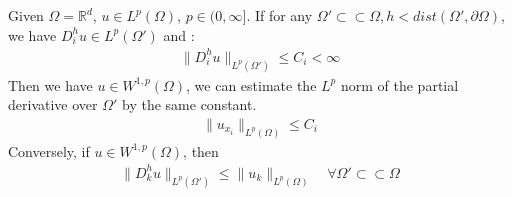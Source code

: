 \begin{proposition}
	Given $\Omega = \mathbb{R}^d$, $u \in L^p(\Omega) $, $p \in (0, \infty]$. If for any $\Omega' \subset \subset \Omega, h < dist(\Omega', \partial\Omega)$,  we have $D_i^h u \in L^p(\Omega')$ and  :
	\begin{align*} 
		\|D_i^h u \|_{L^p(\Omega')} \le  C_i  < \infty
	\end{align*}
	Then we have $u \in W^{1, p}(\Omega)$, we can estimate the $L^p$ norm of the partial derivative over $\Omega'$ by the same constant. 
	\begin{align*}
		\|u_{x_i}\|_{L^p(\Omega)} \le C_i
	\end{align*}
	Conversely, if $u \in W^{1, p}(\Omega)$, then 
	\begin{align*}
		\|D^h_k u \|_{L^p(\Omega')} \le \|u_k\|_{L^p(\Omega)} \quad \forall \Omega'\subset \subset \Omega
	\end{align*}
\end{proposition}

